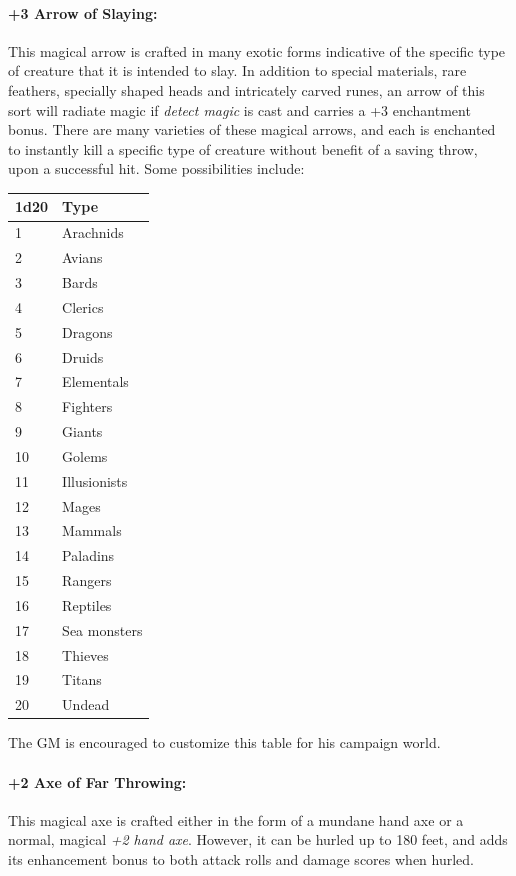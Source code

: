 \begin{multicols}{2}
\paragraph{+3 Arrow of Slaying:}  This magical arrow is crafted in many exotic forms indicative of the specific type of creature that it is intended to slay.  In addition to special materials, rare feathers, specially shaped heads and intricately carved runes, an arrow of this sort will radiate magic if \textit{detect magic} is cast and carries a +3 enchantment bonus.  There are many varieties of these magical arrows, and each is enchanted to instantly kill a specific type of creature without benefit of a saving throw, upon a successful hit.  Some possibilities include:

\noindent \begin{tabular}{|p{}|p{}|}
\hline
1d20	& Type \\
\hline\hline
\rowcolor[gray]{.9}1	& Arachnids \\
2	& Avians \\
\rowcolor[gray]{.9}3	& Bards \\
4	& Clerics \\
\rowcolor[gray]{.9}5	& Dragons \\
6	& Druids \\
\rowcolor[gray]{.9}7	& Elementals \\
8	& Fighters \\
\rowcolor[gray]{.9}9	& Giants \\
10	& Golems \\
\rowcolor[gray]{.9}11	& Illusionists \\
12	& Mages \\
\rowcolor[gray]{.9}13	& Mammals \\
14	& Paladins \\
\rowcolor[gray]{.9}15	& Rangers \\
16	& Reptiles \\
\rowcolor[gray]{.9}17	& Sea monsters \\
18	& Thieves \\
\rowcolor[gray]{.9}19	& Titans \\
20	& Undead \\
\hline
\end{tabular}

The GM is encouraged to customize this table for his campaign world.

\paragraph{+2 Axe of Far Throwing:} This magical axe is crafted either in the form of a mundane hand axe or a normal, magical \textit{+2 hand axe}.  However, it can be hurled up to 180 feet, and adds its enhancement bonus to both attack rolls and damage scores when hurled.


\end{multicols}
